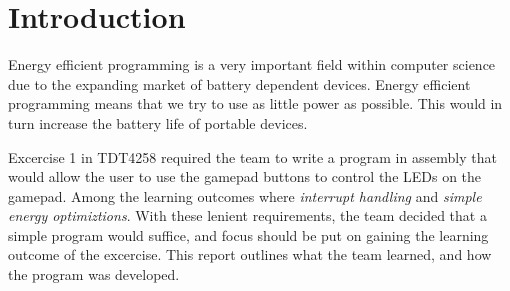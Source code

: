 \section{Introduction}
Energy efficient programming is a very important field within computer science due to the expanding market of battery dependent devices.
Energy efficient programming means that we try to use as little power as possible.
This would in turn increase the battery life of portable devices.

Excercise 1 in TDT4258 required the team to write a program in assembly that would allow the user to use the gamepad buttons to control the LEDs on the gamepad.
Among the learning outcomes where \emph{interrupt handling} and \emph{simple energy optimiztions}.
With these lenient requirements, the team decided that a simple program would suffice, and focus should be put on gaining the learning outcome of the excercise.
This report outlines what the team learned, and how the program was developed.
